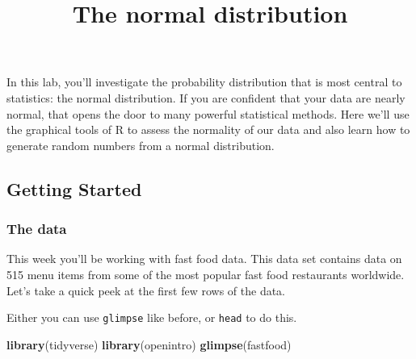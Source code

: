 \documentclass[
]{article}
\title{The normal distribution}
\author{}
\date{\vspace{-2.5em}}
\newenvironment{Shaded}{\begin{snugshade}}{\end{snugshade}}
\newcommand{\FunctionTok}[1]{\textcolor[rgb]{0.13,0.29,0.53}{\textbf{#1}}}
\newcommand{\NormalTok}[1]{#1}
\begin{document}
\maketitle

In this lab, you'll investigate the probability distribution that is
most central to statistics: the normal distribution. If you are
confident that your data are nearly normal, that opens the door to many
powerful statistical methods. Here we'll use the graphical tools of R to
assess the normality of our data and also learn how to generate random
numbers from a normal distribution.

\subsection{Getting Started}\label{getting-started}

\subsubsection{The data}\label{the-data}

This week you'll be working with fast food data. This data set contains
data on 515 menu items from some of the most popular fast food
restaurants worldwide. Let's take a quick peek at the first few rows of
the data.

Either you can use \texttt{glimpse} like before, or \texttt{head} to do
this.

\begin{Shaded}
\begin{Highlighting}[]
\FunctionTok{library}\NormalTok{(tidyverse)}
\FunctionTok{library}\NormalTok{(openintro)}
\FunctionTok{glimpse}\NormalTok{(fastfood)}
\end{Highlighting}
\end{Shaded}
\end{document}
